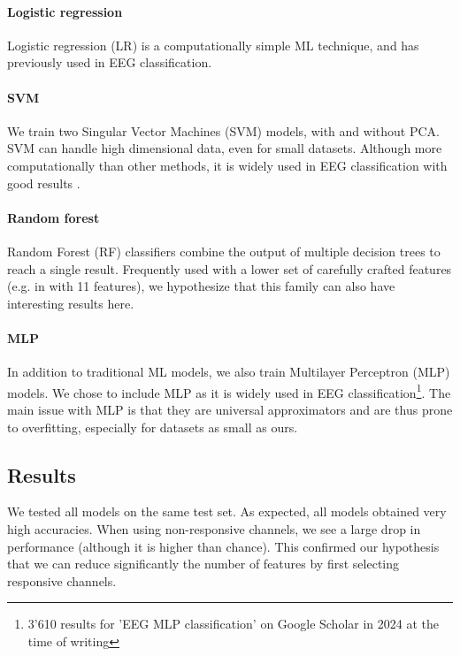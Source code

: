\documentclass[10pt,conference,compsocconf]{IEEEtran}
\begin{document}
\paragraph{Logistic regression}
Logistic regression (LR) is a computationally simple ML technique, and has previously used in EEG classification\cite{SUBASI200587, NIPS2006_35937e34}.

\paragraph{SVM}
We train two Singular Vector Machines (SVM) models, with and without PCA. SVM can handle high dimensional data, even for small datasets. Although more computationally than other methods, it is widely used in EEG classification with good results \cite{knn_svm_review}.

\paragraph{Random forest}
Random Forest (RF) classifiers combine the output of multiple decision trees to reach a single result. Frequently used with a lower set of carefully crafted features (e.g. in \cite{eegrfclassif} with 11 features), we hypothesize that this family can also have interesting results here.

\paragraph{MLP}
In addition to traditional ML models, we also train Multilayer Perceptron (MLP) models. We chose to include MLP as it is widely used in EEG classification\footnote{3'610 results for 'EEG MLP classification' on Google Scholar in 2024 at the time of writing}. The main issue with MLP is that they are universal approximators and are thus prone to overfitting, especially for datasets as small as ours.

\subsection{Results}
We tested all models on the same test set. As expected, all models obtained very high accuracies. When using non-responsive channels, we see a large drop in performance (although it is higher than chance). This confirmed our hypothesis that we can reduce significantly the number of features by first selecting responsive channels.
\end{document}
